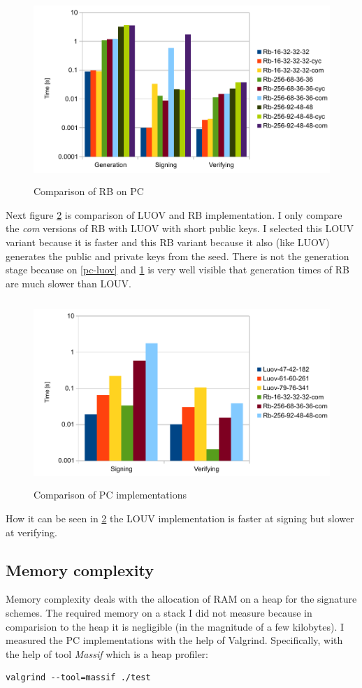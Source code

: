 \documentclass[thesis=M,english]{FITthesis}[2019/12/23]
\begin{document}
\begin{figure}[H]
\centering
\includegraphics[width=13cm,height=7cm]{images/pc-rb.pdf}
\caption{Comparison of RB on PC}
\label{pc-rb}
\end{figure}

\noindent
Next figure \ref{pc-all} is comparison of LUOV and RB implementation. I only compare the \textit{com} versions of RB with LUOV with short public keys. I selected this LOUV variant because it is faster and this RB variant because it also (like LUOV) generates the public and private keys from the seed.
There is not the generation stage because on \ref{pc-luov} and \ref{pc-rb} is very well visible that generation times of RB are much slower than LOUV. 

\begin{figure}[H]
\centering
\includegraphics[width=13cm,height=7cm]{images/pc-all.pdf}
\caption{Comparison of PC implementations}
\label{pc-all}
\end{figure}

\noindent
How it can be seen in \ref{pc-all} the LOUV implementation is faster at signing but slower at verifying.

\subsection{Memory complexity}\label{pc-mem-measurement}
Memory complexity deals with the allocation of RAM on a heap for the signature schemes. The required memory on a stack I did not measure because in comparision to the heap it is negligible (in the magnitude of a few kilobytes). I measured the PC implementations with the help of Valgrind. Specifically, with the help of tool \textit{Massif} which is a heap profiler:
\begin{lstlisting}[frame=single]
valgrind --tool=massif ./test
\end{lstlisting}
\end{document}
